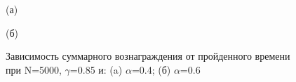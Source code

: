 \documentclass[a4paper]{report}
\theoremstyle{definition}
\theoremstyle{plain}
\theoremstyle{remark}
\theoremstyle{remark}
\theoremstyle{definition}
\begin{document}
\begin{figure}[H]
    \begin{minipage}[H]{0.49\linewidth}
        (а)\\
    \end{minipage}
    \hfill
    \begin{minipage}[H]{0.49\linewidth}
        (б)\\
    \end{minipage}
      \caption{Зависимость суммарного вознаграждения от пройденного времени при N=5000, $\gamma$=0.85 и: (a) $\alpha$=0.4; (б) $\alpha$=0.6}
\end{figure}
\end{document}
